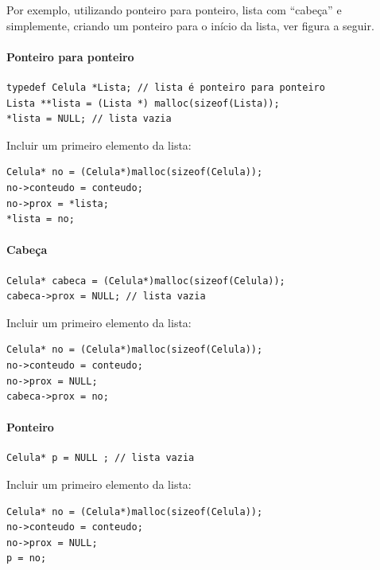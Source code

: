 \documentclass[12pt,a4paper]{article}
\begin{document}
Por exemplo, utilizando ponteiro para ponteiro, lista com ``cabeça'' e
simplemente, criando um ponteiro para o início da lista, ver figura a
seguir.

    \hypertarget{ponteiro-para-ponteiro}{%
\paragraph{Ponteiro para ponteiro}\label{ponteiro-para-ponteiro}}

\begin{verbatim}
typedef Celula *Lista; // lista é ponteiro para ponteiro
Lista **lista = (Lista *) malloc(sizeof(Lista));
*lista = NULL; // lista vazia
\end{verbatim}

Incluir um primeiro elemento da lista:

\begin{verbatim}
Celula* no = (Celula*)malloc(sizeof(Celula));
no->conteudo = conteudo;
no->prox = *lista;
*lista = no; 
\end{verbatim}

    \hypertarget{cabeuxe7a}{%
\paragraph{Cabeça}\label{cabeuxe7a}}

\begin{verbatim}
Celula* cabeca = (Celula*)malloc(sizeof(Celula));
cabeca->prox = NULL; // lista vazia
\end{verbatim}

Incluir um primeiro elemento da lista:

\begin{verbatim}
Celula* no = (Celula*)malloc(sizeof(Celula));
no->conteudo = conteudo;
no->prox = NULL;
cabeca->prox = no; 
\end{verbatim}

    \hypertarget{ponteiro}{%
\paragraph{Ponteiro}\label{ponteiro}}

\begin{verbatim}
Celula* p = NULL ; // lista vazia
\end{verbatim}

Incluir um primeiro elemento da lista:

\begin{verbatim}
Celula* no = (Celula*)malloc(sizeof(Celula));
no->conteudo = conteudo;
no->prox = NULL;
p = no; 
\end{verbatim}
\end{document}
